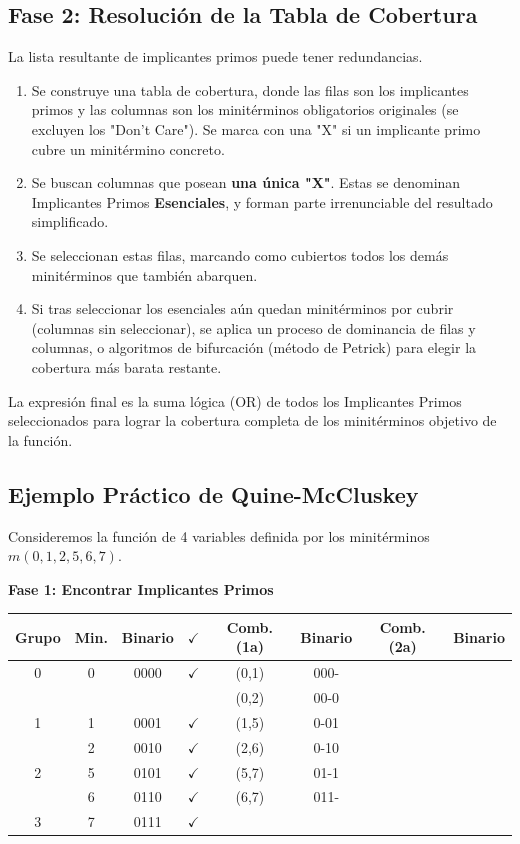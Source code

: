 \subsection{Fase 2: Resolución de la Tabla de Cobertura}
La lista resultante de implicantes primos puede tener redundancias.
\begin{enumerate}
    \item Se construye una tabla de cobertura, donde las filas son los implicantes primos y las columnas son los minitérminos obligatorios originales (se excluyen los "Don't Care"). Se marca con una "X" si un implicante primo cubre un minitérmino concreto.
    \item Se buscan columnas que posean \textbf{una única "X"}. Estas se denominan Implicantes Primos \textbf{Esenciales}, y forman parte irrenunciable del resultado simplificado.
    \item Se seleccionan estas filas, marcando como cubiertos todos los demás minitérminos que también abarquen.
    \item Si tras seleccionar los esenciales aún quedan minitérminos por cubrir (columnas sin seleccionar), se aplica un proceso de dominancia de filas y columnas, o algoritmos de bifurcación (método de Petrick) para elegir la cobertura más barata restante.
\end{enumerate}

La expresión final es la suma lógica (OR) de todos los Implicantes Primos seleccionados para lograr la cobertura completa de los minitérminos objetivo de la función.

\subsection{Ejemplo Práctico de Quine-McCluskey}
Consideremos la función de 4 variables definida por los minitérminos $m(0, 1, 2, 5, 6, 7).$ 

\textbf{Fase 1: Encontrar Implicantes Primos}
\begin{center}
\begin{tabular}{|c|c|c|c||c|c||c|c|}
\hline
\textbf{Grupo} & \textbf{Min.} & \textbf{Binario} & $\checkmark$ & \textbf{Comb. (1a)} & \textbf{Binario} & \textbf{Comb. (2a)} & \textbf{Binario} \\ \hline
0 & 0 & 0000 & $\checkmark$ & (0,1) & 000- &  &  \\ 
  &   &      &              & (0,2) & 00-0 &  &  \\ \hline
1 & 1 & 0001 & $\checkmark$ & (1,5) & 0-01 &  &  \\ 
  & 2 & 0010 & $\checkmark$ & (2,6) & 0-10 &  &  \\ \hline
2 & 5 & 0101 & $\checkmark$ & (5,7) & 01-1 &  &  \\ 
  & 6 & 0110 & $\checkmark$ & (6,7) & 011- &  &  \\ \hline
3 & 7 & 0111 & $\checkmark$ &       &      &  &  \\ \hline
\end{tabular}
\end{center}

